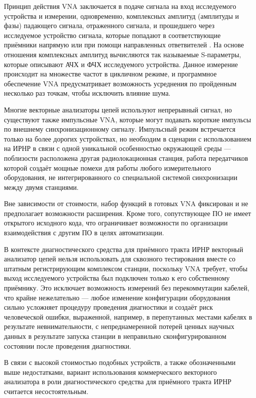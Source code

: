 \documentclass{report}
\begin{document}
Принцип действия VNA заключается в подаче сигнала на вход исследуемого устройства и измерении, одновременно, комплексных амплитуд (амплитуды и фазы) падающего сигнала, отраженного сигнала, и прошедшего через исследуемое устройство сигнала, которые попадают в соответствующие приёмники напрямую или при помощи направленных ответвителей \cite{vna1}. На основе отношения комплексных амплитуд вычисляются так называемые S-параметры, которые описывают АЧХ и ФЧХ исследуемого устройства. Данное измерение происходит на множестве частот в цикличном режиме, и программное обеспечение VNA предусматривает возможность усреднения по пройденным несколько раз точкам, чтобы исключить влияние шума.

Многие векторные анализаторы цепей используют непрерывный сигнал, но существуют также импульсные VNA, которые могут подавать короткие импульсы по внешнему синхронизационному сигналу. Импульсный режим встречается только на более дорогих устройствах, но необходим в сценарии с использованием на ИРНР в связи с одной уникальной особенностью окружающей среды --- поблизости расположена другая радиолокационная станция, работа передатчиков которой создаёт мощные помехи для работы любого измерительного оборудования, не интегрированного со специальной системой синхронизации между двумя станциями.

Вне зависимости от стоимости, набор функций в готовых VNA фиксирован и не предполагает возможности расширения. Кроме того, сопутствующее ПО не имеет открытого исходного кода, что ограничивает возможности по организации взаимодействия с другим ПО в целях автоматизации.

В контексте диагностического средства для приёмного тракта ИРНР векторный анализатор цепей нельзя использовать для сквозного тестирования вместе со штатным регистрирующим комплексом станции, поскольку VNA требует, чтобы выход исследуемого устройства был подключен только к его собственному приёмнику. Это исключает возможность измерений без перекоммутации кабелей, что крайне нежелательно --- любое изменение конфигурации оборудования сильно усложняет процедуру проведения диагностики и создаёт риск человеческой ошибки, выраженной, например, в перепутанных местами кабелях в результате невнимательности, с непреднамеренной потерей ценных научных данных в результате запуска станции в неправильно сконфигурированном состоянии после проведения диагностики.

В связи с высокой стоимостью подобных устройств, а также обозначенными выше недостатками, вариант использования коммерческого векторного анализатора в роли диагностического средства для приёмного тракта ИРНР считается несостоятельным.
\end{document}
